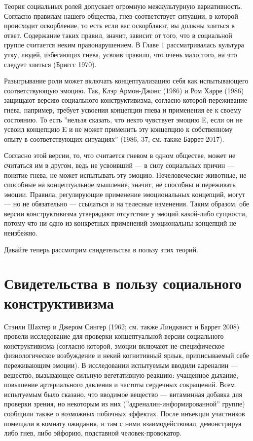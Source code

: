 \documentclass[11pt]{book}
\begin{document}
Теория социальных ролей допускает огромную межкультурную вариативность. Согласно правилам нашего общества, гнев соответствует ситуации, в которой происходит оскорбление, то есть если вас оскорбляют, вы должны злиться в ответ. Содержание таких правил, значит, зависит от того, что в социальной группе считается неким правонарушением. В Главе 1 рассматривалась культура утку, людей, избегающих гнева, усвоив правило, что очень мало того, на что следует злиться (Бриггс 1970).

Разыгрывание роли может включать концептуализацию себя как испытывающего соответствующую эмоцию. Так, Клэр Армон-Джонс (1986) и Ром Харре (1986) защищают версию социального конструктивизма, согласно которой переживание гнева, например, требует усвоения концепции гнева и применения ее к своему состоянию. То есть ''нельзя сказать, что некто чувствует эмоцию E, если он не усвоил концепцию E и не может применить эту концепцию к собственному опыту в соответствующих ситуациях'' (1986, 37; см. также Баррет 2017).

Согласно этой версии, то, что считается гневом в одном обществе, может не считаться им в другом, ведь не усвоивший --- в силу социальных причин --- понятие гнева, не может испытывать эту эмоцию. Нечеловеческие животные, не способные на концептуальное мышление, значит, не способны и переживать эмоции. Правила, регулирующие применение эмоциональных концепций, могут --- но не обязательно --- ссылаться и на телесные изменения. Таким образом, обе версии конструктивизма утверждают отсутствие у эмоций какой-либо сущности, потому что ни одно из конкретных применений эмоциональны концепций не неизбежно.

Давайте теперь рассмотрим свидетельства в пользу этих теорий.

\section{Свидетельства в пользу социального конструктивизма}

Стэнли Шахтер и Джером Сингер (1962; см. также Линдквист и Баррет 2008) провели исследование для проверки концептуальной версии социального конструктивизма (согласно которой, эмоции включают не-специфическое физиологическое возбуждение и некий когнитивный ярлык, приписываемый себе переживающим эмоции). В исследовании испытуемым вводили адреналин --- вещество, вызывающее сильную вегетативную реакцию: учащенное дыхание, повышение артериального давления и частоты сердечных сокращений. Всем испытуемым было сказано, что вводимое вещество --- витаминная добавка для проверки зрения, но некоторым из них (''адреналин-информированной'' группе) сообщили также о возможных побочных эффектах. После инъекции участников помещали в комнату ожидания, и там с ними взаимодействовал, демонстрируя либо гнев, либо эйфорию, подставной человек-провокатор.
\end{document}
